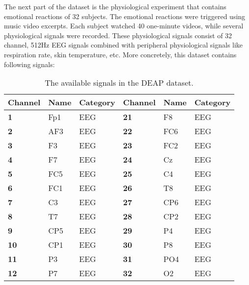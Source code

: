 The next part of the dataset is the physiological experiment that contains emotional reactions of 32 subjects. The emotional reactions were triggered using music video excerpts. Each subject watched 40 one-minute videos, while several physiological signals were recorded. These physiological signals consist of 32 channel, 512Hz EEG signals combined with peripheral physiological signals like respiration rate, skin temperature, etc. More concretely, this dataset contains following signals:
\begin{table}[H]
\centering
\caption{The available signals in the DEAP dataset\label{DEAPSignals}.}
\begin{tabular}{l|ll|l|ll}
\textbf{Channel} & \textbf{Name} & \textbf{Category} & \textbf{Channel} & \textbf{Name}    & \textbf{Category} \\ \hline
\textbf{1}       & Fp1           & EEG               & \textbf{21}      & F8               & EEG               \\
\textbf{2}       & AF3           & EEG               & \textbf{22}      & FC6              & EEG               \\
\textbf{3}       & F3            & EEG               & \textbf{23}      & FC2              & EEG               \\
\textbf{4}       & F7            & EEG               & \textbf{24}      & Cz               & EEG               \\
\textbf{5}       & FC5           & EEG               & \textbf{25}      & C4               & EEG               \\
\textbf{6}       & FC1           & EEG               & \textbf{26}      & T8               & EEG               \\
\textbf{7}       & C3            & EEG               & \textbf{27}      & CP6              & EEG               \\
\textbf{8}       & T7            & EEG               & \textbf{28}      & CP2              & EEG               \\
\textbf{9}       & CP5           & EEG               & \textbf{29}      & P4               & EEG               \\
\textbf{10}      & CP1           & EEG               & \textbf{30}      & P8               & EEG               \\
\textbf{11}      & P3            & EEG               & \textbf{31}      & PO4              & EEG               \\
\textbf{12}      & P7            & EEG               & \textbf{32}      & O2               & EEG               \\

\end{tabular}
\end{table}
